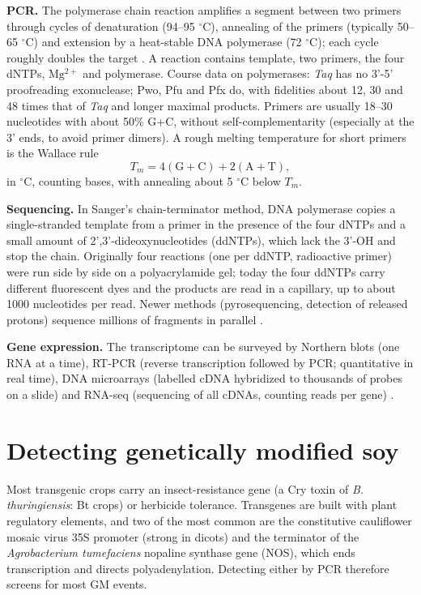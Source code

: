 \textbf{PCR.}
The polymerase chain reaction amplifies a
segment between two primers through cycles of
denaturation (94--95 $^\circ$C), annealing of
the primers (typically 50--65 $^\circ$C) and
extension by a heat-stable DNA polymerase (72
$^\circ$C); each cycle roughly doubles the
target \cite[Section
3-5]{voet2013fundamentals}. A reaction
contains template, two primers, the four
dNTPs, $\mathrm{Mg^{2+}}$ and polymerase.
Course data on polymerases: \emph{Taq} has no
3'-5' proofreading exonuclease; Pwo, Pfu and
Pfx do, with fidelities about 12, 30 and 48
times that of \emph{Taq} and longer maximal
products. Primers are usually 18--30
nucleotides with about 50\% G+C, without
self-complementarity (especially at the 3'
ends, to avoid primer dimers). A rough
melting temperature for short primers is the
Wallace rule
$$
T_m = 4(\mathrm{G}+\mathrm{C}) +
2(\mathrm{A}+\mathrm{T}),
$$
in $^\circ$C, counting bases, with annealing
about 5 $^\circ$C below $T_m$.

\textbf{Sequencing.}
In Sanger's chain-terminator method, DNA
polymerase copies a single-stranded template
from a primer in the presence of the four
dNTPs and a small amount of
2',3'-dideoxynucleotides (ddNTPs), which lack
the 3'-OH and stop the chain. Originally four
reactions (one per ddNTP, radioactive primer)
were run side by side on a polyacrylamide
gel; today the four ddNTPs carry different
fluorescent dyes and the products are read in
a capillary, up to about 1000 nucleotides per
read. Newer methods (pyrosequencing,
detection of released protons) sequence
millions of fragments in parallel
\cite[Section 3-4]{voet2013fundamentals}.

\textbf{Gene expression.}
The transcriptome can be surveyed by Northern
blots (one RNA at a time), RT-PCR (reverse
transcription followed by PCR; quantitative
in real time), DNA microarrays (labelled cDNA
hybridized to thousands of probes on a slide)
and RNA-seq (sequencing of all cDNAs,
counting reads per gene) \cite[Chapter
10]{alberts2014essential}.

\section{Detecting genetically modified soy}
\label{section-mcb-gmo}

Most transgenic crops carry an
insect-resistance gene (a Cry toxin of
\emph{B. thuringiensis}: Bt crops) or
herbicide tolerance. Transgenes are built
with plant regulatory elements, and two of
the most common are the constitutive
cauliflower mosaic virus 35S promoter (strong
in dicots) and the terminator of the
\emph{Agrobacterium tumefaciens} nopaline
synthase gene (NOS), which ends transcription
and directs polyadenylation. Detecting either
by PCR therefore screens for most GM events.

